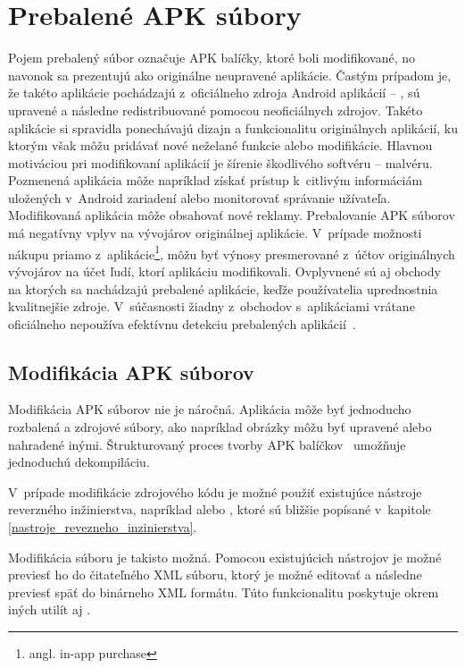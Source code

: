 \chapter{Prebalené APK súbory}
\label{Repackaged}
Pojem prebalený súbor označuje APK balíčky, ktoré boli modifikované, no navonok sa prezentujú ako originálne neupravené aplikácie. Častým prípadom je, že takéto aplikácie pochádzajú z~oficiálneho zdroja Android aplikácií -- , sú upravené a následne redistribuované pomocou neoficiálnych zdrojov. Takéto aplikácie si spravidla ponechávajú dizajn a funkcionalitu originálnych aplikácií, ku ktorým však môžu pridávať nové neželané funkcie alebo modifikácie. Hlavnou motiváciou pri modifikovaní aplikácií je šírenie škodlivého softvéru – malvéru. Pozmenená aplikácia môže napríklad získať prístup k~citlivým informáciám uložených v~Android zariadení alebo monitorovať správanie užívateľa. Modifikovaná aplikácia môže obsahovať nové reklamy. Prebalovanie APK súborov má negatívny vplyv na vývojárov originálnej aplikácie. V~prípade možnosti nákupu priamo z~aplikácie\footnote{angl. in-app purchase}, môžu byť výnosy presmerované z~účtov originálnych vývojárov na účet ľudí, ktorí aplikáciu modifikovali. Ovplyvnené sú aj obchody na ktorých sa nachádzajú prebalené aplikácie, keďže používatelia uprednostnia kvalitnejšie zdroje. V~súčasnosti žiadny z~obchodov s~aplikáciami vrátane oficiálneho  nepoužíva efektívnu detekciu prebalených aplikácií~\cite{Zhauniarovich2014}. 

\section{Modifikácia APK súborov}
Modifikácia APK súborov nie je náročná. Aplikácia môže byť jednoducho rozbalená a zdrojové súbory, ako napríklad obrázky môžu byť upravené alebo nahradené inými. Štrukturovaný proces tvorby APK balíčkov~\cite{buildingAndRunning} umožňuje jednoduchú dekompiláciu. 

V~prípade modifikácie zdrojového kódu je možné použiť existujúce nástroje reverzného inžinierstva, napríklad  alebo , ktoré sú bližšie popísané v~kapitole \ref{nastroje_revezneho_inzinierstva}. 

Modifikácia súboru  je takisto možná. Pomocou existujúcich nástrojov je možné  previesť ho do čitateľného XML súboru, ktorý je možné editovať a následne previesť späť do binárneho XML formátu. Túto funkcionalitu poskytuje okrem iných utilít aj .

